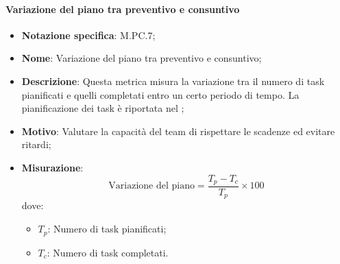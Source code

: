 \paragraph*{Variazione del piano tra preventivo e consuntivo}
\begin{itemize}
    \item \textbf{Notazione specifica}: M.PC.7;
    \item \textbf{Nome}: Variazione del piano tra preventivo e consuntivo;
    \item \textbf{Descrizione}: Questa metrica misura la variazione tra il numero di task pianificati e quelli completati entro un certo periodo di tempo. La pianificazione dei task è riportata nel \PianoDiProgetto;
    \item \textbf{Motivo}: Valutare la capacità del team di rispettare le scadenze ed evitare ritardi;
    \item \textbf{Misurazione}:
    \[
        \text{Variazione del piano} = \frac{T_p - T_c}{T_p} \times 100
    \]
    dove:
    \begin{itemize}
        \item $T_{p}$: Numero di task pianificati;
        \item $T_{c}$: Numero di task completati.
    \end{itemize}
\end{itemize}
